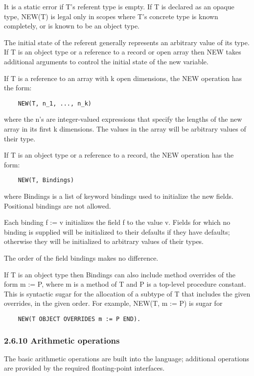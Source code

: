 \documentclass[10pt]{article}
\begin{document}
It is a static error if T's referent type is empty. If T is declared as an
opaque type, NEW(T) is legal only in scopes where T's concrete type is known
completely, or is known to be an object type.

The initial state of the referent generally represents an arbitrary value of
its type. If T is an object type or a reference to a record or open array then
NEW takes additional arguments to control the initial state of the new
variable.

If T is a reference to an array with k open dimensions, the NEW operation has
the form:
\begin{verbatim}
    NEW(T, n_1, ..., n_k)
\end{verbatim}
where the n's are integer-valued expressions that specify the lengths of the
new array in its first k dimensions. The values in the array will be arbitrary
values of their type.

If T is an object type or a reference to a record, the NEW operation has the
form:
\begin{verbatim}
    NEW(T, Bindings)
\end{verbatim}
where Bindings is a list of keyword bindings used to initialize the new
fields. Positional bindings are not allowed.

Each binding f := v initializes the field f to the value v. Fields for which
no binding is supplied will be initialized to their defaults if they have
defaults; otherwise they will be initialized to arbitrary values of their
types.

The order of the field bindings makes no difference.

If T is an object type then Bindings can also include method overrides of the
form m := P, where m is a method of T and P is a top-level procedure
constant. This is syntactic sugar for the allocation of a subtype of T that
includes the given overrides, in the given order. For example, NEW(T, m := P)
is sugar for
\begin{verbatim}
    NEW(T OBJECT OVERRIDES m := P END).
\end{verbatim}

\subsubsection*{2.6.10 Arithmetic operations}

The basic arithmetic operations are built into the language; additional
operations are provided by the required floating-point interfaces.
\end{document}
